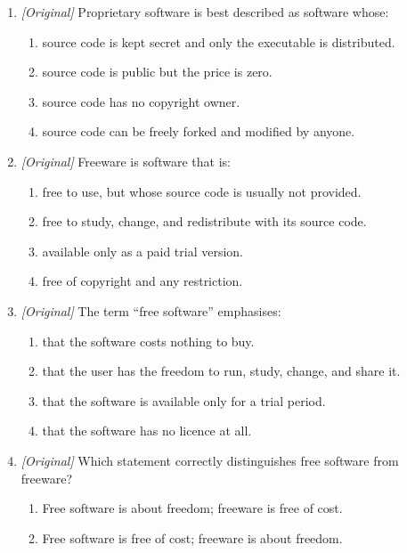 \begin{enumerate}[label=\textbf{Q\arabic*.}, leftmargin=*]
\begin{enumerate}[label=\Alph*.]
    \item the compiled object code distributed to users.
    \item the licence text that accompanies software.
  \end{enumerate}
\item \textit{[Original]} Proprietary software is best described as software
  whose:
  \begin{enumerate}[label=\Alph*.]
    \item source code is kept secret and only the executable is distributed.
    \item source code is public but the price is zero.
    \item source code has no copyright owner.
    \item source code can be freely forked and modified by anyone.
  \end{enumerate}
\item \textit{[Original]} Freeware is software that is:
  \begin{enumerate}[label=\Alph*.]
    \item free to use, but whose source code is usually not provided.
    \item free to study, change, and redistribute with its source code.
    \item available only as a paid trial version.
    \item free of copyright and any restriction.
  \end{enumerate}
\item \textit{[Original]} The term ``free software'' emphasises:
  \begin{enumerate}[label=\Alph*.]
    \item that the software costs nothing to buy.
    \item that the user has the freedom to run, study, change, and share it.
    \item that the software is available only for a trial period.
    \item that the software has no licence at all.
  \end{enumerate}
\item \textit{[Original]} Which statement correctly distinguishes free software
  from freeware?
  \begin{enumerate}[label=\Alph*.]
    \item Free software is about freedom; freeware is free of cost.
    \item Free software is free of cost; freeware is about freedom.

\end{enumerate}
\end{enumerate}

